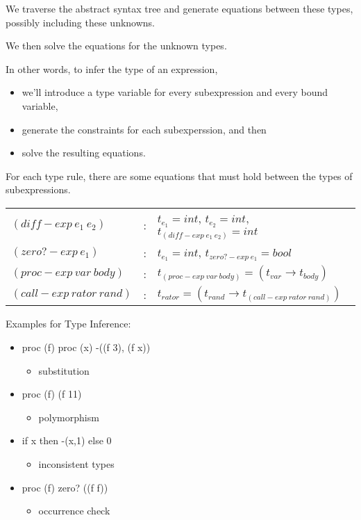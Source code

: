 \documentclass{article}
\begin{document}
\begin{huge}
We traverse the abstract syntax tree and generate equations between these types, possibly including these unknowns. 

We then solve the equations for the unknown types.


In other words, to infer the type of an expression, 
\begin{itemize}
\item we'll introduce a type variable for every subexpression and every bound variable,
\item generate the constraints for each subexperssion, and then 
\item solve the resulting equations.
\end{itemize}


For each type rule, there are some equations that must hold between the types of subexpressions.

\begin{tabular}{l l l}
$(diff-exp \ e_1 \ e_2)$ & : & $t_{e_1} = int$, $t_{e_2} =int$, $t_{(diff-exp \ e_1 \ e_2)} = int$ \\
$(zero?-exp \ e_1)$ & : & $t_{e_1}=int$, $t_{zero?-exp \ e_1}=bool$ \\
$(proc-exp \ var \ body)$ & : & $t_{(proc-exp \ var \ body)} = (t_{var} \rightarrow t_{body})$ \\
$(call-exp \ rator \ rand)$ & : & $t_{rator} = (t_{rand} \rightarrow t_{(call-exp \ rator \ rand)})$
\end{tabular}


Examples for Type Inference: 
\begin{itemize}
\item proc (f) proc (x) -((f 3), (f x))
\begin{itemize}
\item substitution
\end{itemize}
\item proc (f) (f 11)
\begin{itemize}
\item polymorphism
\end{itemize}
\item if x then -(x,1) else 0
\begin{itemize}
\item inconsistent types
\end{itemize}
\item proc (f) zero? ((f f))
\begin{itemize}
\item occurrence check
\end{itemize}
\end{itemize}


\end{huge}
\end{document}
